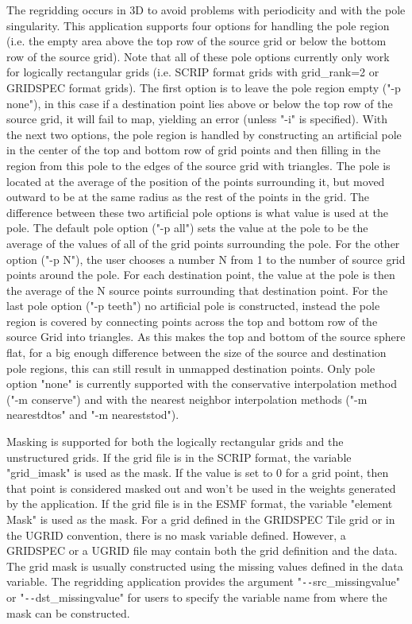The regridding occurs in 3D to avoid
problems with periodicity and with the pole singularity. This application
supports four options for handling the pole region (i.e. the empty area above the top row of the source grid or below
the bottom row of the source grid).  Note that all of these pole options currently only work for logically rectangular grids (i.e. SCRIP format grids with grid\_rank=2 or GRIDSPEC format grids). The first option is to leave the pole region empty ("-p none"), in this
case if a destination point lies above or below the
top row of the source grid, it will fail to map, yielding an error (unless "-i" is specified).
With the next two options, the pole region is handled by constructing
an artificial pole in the center of the top and bottom row of grid points and then filling
in the region from this pole to the edges of the source grid with triangles.
The pole is located at the average of the position of the points surrounding
it, but moved outward to be at the same radius as the rest of the points
in the grid. The difference between these two artificial pole options is what value is used at the pole.
The default pole option ("-p all") sets the value at the pole to be the average of the values
of all of the grid points surrounding the pole. For the other option ("-p N"), the user chooses
a number N from 1 to the number of source grid points around the pole. For
each destination point, the value at the pole is then the average of the N source points
surrounding that destination point. For the last pole option ("-p teeth") no artificial pole is constructed, instead the
pole region is covered by connecting points across the top and bottom row of the source Grid into triangles. As
this makes the top and bottom of the source sphere flat, for a big enough difference between the size of
the source and destination pole regions, this can still result in unmapped destination points.
Only pole option "none" is currently supported with the conservative interpolation method ("-m conserve") and with the
nearest neighbor interpolation methods ("-m nearestdtos" and "-m neareststod").

Masking is supported for both the logically rectangular grids and the unstructured grids.
If the grid file is in the SCRIP format, the variable "grid\_imask" is used as the mask.
If the value is set to 0 for a grid point, then that point is considered masked out and
won't be used in the weights generated by the application. If the grid file is in the ESMF format, the variable "element Mask" is used as the mask.  For a grid defined in the GRIDSPEC
Tile grid or in the UGRID convention, there is no mask variable defined.
However, a GRIDSPEC or a UGRID file may contain both the grid definition and the data.
The grid mask is usually constructed using the missing values defined in the data variable.
The regridding application provides the argument "\verb+--+src\_missingvalue" or
"\verb+--+dst\_missingvalue" for users to specify the variable name from where the mask can be
constructed.

